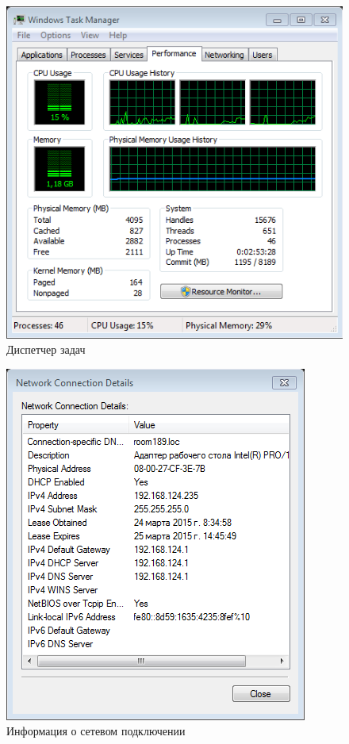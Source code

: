 \documentclass[a4paper, 12pt]{report}		%
\begin{document}
\begin{figure}[h!]
\centering
\includegraphics[scale=1]{res/taskmanager}
\caption{Диспетчер задач}
\end{figure}

\begin{figure}[h!]
\centering
\includegraphics[scale=0.75]{res/network}
\caption{Информация о сетевом подключении}
\end{figure}
\end{document}
